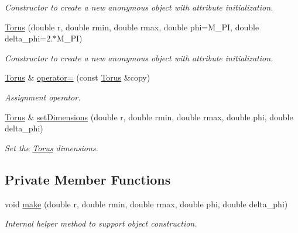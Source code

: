 \begin{DoxyCompactItemize}
\begin{DoxyCompactList}\small\item\em Constructor to create a new anonymous object with attribute initialization. \item\end{DoxyCompactList}\item 
\hyperlink{class_d_d4hep_1_1_geometry_1_1_torus_aafbe7786b4554751775d5038fcbf8d3a}{Torus} (double r, double rmin, double rmax, double phi=M\_\-PI, double delta\_\-phi=2.$\ast$M\_\-PI)
\begin{DoxyCompactList}\small\item\em Constructor to create a new anonymous object with attribute initialization. \item\end{DoxyCompactList}\item 
\hyperlink{class_d_d4hep_1_1_geometry_1_1_torus}{Torus} \& \hyperlink{class_d_d4hep_1_1_geometry_1_1_torus_a755713aeb9d7fc479897742f420ae256}{operator=} (const \hyperlink{class_d_d4hep_1_1_geometry_1_1_torus}{Torus} \&copy)
\begin{DoxyCompactList}\small\item\em Assignment operator. \item\end{DoxyCompactList}\item 
\hyperlink{class_d_d4hep_1_1_geometry_1_1_torus}{Torus} \& \hyperlink{class_d_d4hep_1_1_geometry_1_1_torus_a41bf8eb0dae9ebabda620358cad1c648}{setDimensions} (double r, double rmin, double rmax, double phi, double delta\_\-phi)
\begin{DoxyCompactList}\small\item\em Set the \hyperlink{class_d_d4hep_1_1_geometry_1_1_torus}{Torus} dimensions. \item\end{DoxyCompactList}\end{DoxyCompactItemize}
\subsection*{Private Member Functions}
\begin{DoxyCompactItemize}
\item 
void \hyperlink{class_d_d4hep_1_1_geometry_1_1_torus_afdb3cd4dc6b2095d511330920f0db3fa}{make} (double r, double rmin, double rmax, double phi, double delta\_\-phi)
\begin{DoxyCompactList}\small\item\em Internal helper method to support object construction. \item\end{DoxyCompactList}\end{DoxyCompactItemize}


